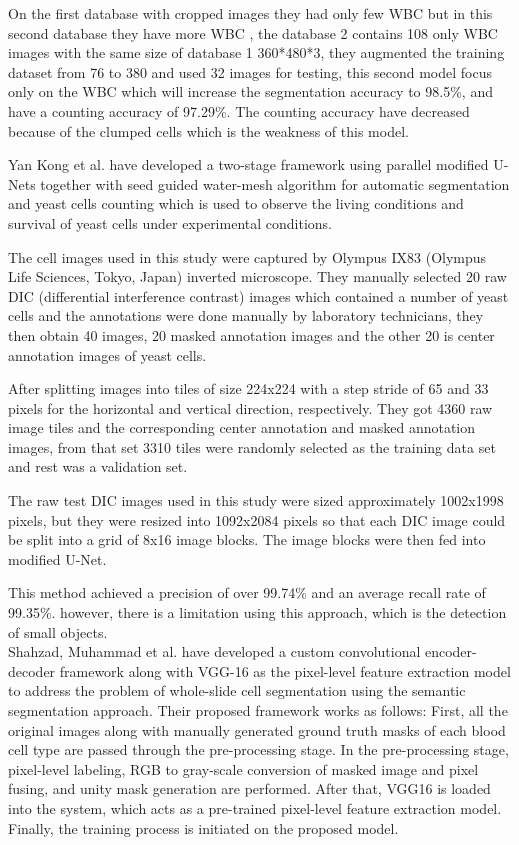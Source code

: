 \documentclass[conference]{IEEEtran}
\begin{document}
On the first database with cropped images they had only few WBC but in this second database they have more WBC , the database 2 contains 108 only WBC images with the same size of database 1 360*480*3, they augmented the training dataset from 76 to 380 and used 32 images for testing, this second model focus only on the WBC which will increase the segmentation accuracy to 98.5\%, and have a counting accuracy of 97.29\%. The counting accuracy have decreased because of the clumped cells which is the weakness of this model.

Yan Kong et al.\cite{Kong:20} have developed a two-stage framework using parallel modified U-Nets together with seed guided water-mesh algorithm for automatic segmentation and yeast cells counting which is used to observe the living conditions and survival of yeast cells under experimental conditions.\

The cell images used in this study were captured by Olympus IX83 (Olympus Life Sciences, Tokyo, Japan) inverted microscope. They manually selected 20 raw DIC (differential interference contrast) images which contained a number of yeast cells and the annotations were done manually by laboratory technicians, they then obtain 40 images, 20 masked annotation images and the other 20 is center annotation images of yeast cells.\

After splitting images into tiles of size 224x224 with a step stride of 65 and 33 pixels for the horizontal and vertical direction, respectively. They got 4360 raw image tiles and the corresponding center annotation and masked annotation images, from that set 3310 tiles were randomly selected as the training data set and rest was a validation set.

The raw test DIC images used in this study were sized approximately 1002x1998 pixels, but they were resized into 1092x2084 pixels so that each DIC image could be split into a grid of 8x16 image blocks. The image blocks were then fed into modified U-Net.

This method achieved a precision of over 99.74\% and an average recall rate of 99.35\%. however, there is a limitation using this approach, which is the detection of small objects.\\

Shahzad, Muhammad et al. \cite{shahzad2020robust} have developed a custom convolutional encoder-decoder framework along with VGG-16 as the pixel-level feature extraction model to address the problem of whole-slide cell segmentation using the semantic segmentation approach. Their proposed framework works as follows: First, all the original images along with manually generated ground truth masks of each blood cell type are passed through the pre-processing stage. In the pre-processing stage, pixel-level labeling, RGB to gray-scale conversion of masked image and pixel fusing, and unity mask generation are performed. After that, VGG16 is loaded into the system, which acts as a pre-trained pixel-level feature extraction model. Finally, the training process is initiated on the proposed model.
\end{document}
